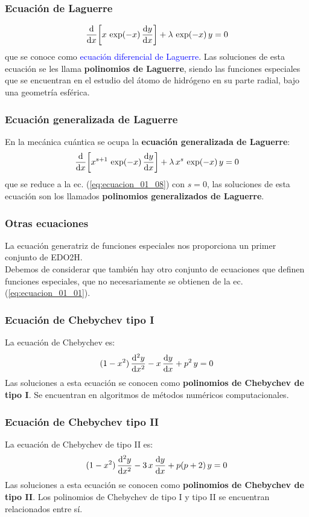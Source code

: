 \documentclass[12pt]{beamer}
\begin{document}
\begin{frame}
\frametitle{Ecuación de Laguerre}
\begin{align*}
\dv{x} \bigg[ x \, \exp(-x) \, \dv{y}{x} \bigg] + \lambda \, \exp(-x) \, y = 0
\end{align*}
\pause
que se conoce como \textcolor{blue}{ecuación diferencial de Laguerre}. \pause Las soluciones de esta ecuación se les llama \textbf{polinomios de Laguerre}, siendo las funciones especiales que se encuentran en el estudio del átomo de hidrógeno en su parte radial, bajo una geometría esférica.
\end{frame}
\begin{frame}
\frametitle{Ecuación generalizada de Laguerre}
En la mecánica cuántica se ocupa la \textbf{ecuación generalizada de Laguerre}:
\begin{align*}
\dv{x} \bigg[ x^{s+1} \, \exp(-x) \, \dv{y}{x} \bigg] + \lambda \, x^{s} \, \exp(-x) \, y = 0
\end{align*}
\pause
que se reduce a la ec. (\ref{eq:ecuacion_01_08}) con $s = 0$, las soluciones de esta ecuación son los llamados \textbf{polinomios generalizados de Laguerre}.
\end{frame}
\begin{frame}
\frametitle{Otras ecuaciones}
La ecuación generatriz de funciones especiales nos proporciona un primer conjunto de EDO2H.
\\
\bigskip
\pause
Debemos de considerar que también hay otro conjunto de ecuaciones que definen funciones especiales, que no necesariamente se obtienen de la ec. (\ref{eq:ecuacion_01_01}).
\end{frame}
\begin{frame}
\frametitle{Ecuación de Chebychev tipo I}
La ecuación de Chebychev es:
\begin{align*}
(1 - x^{2}) \, \dv[2]{y}{x} - x \, \dv{y}{x} +  p^{2} \, y = 0
\end{align*}
\pause
Las soluciones a esta ecuación se conocen como \textbf{polinomios de Chebychev de tipo I}. \pause Se encuentran en algoritmos de métodos numéricos computacionales.
\end{frame}
\begin{frame}
\frametitle{Ecuación de Chebychev tipo II}
La ecuación de Chebychev de tipo II es:
\begin{align*}
(1 - x^{2}) \, \dv[2]{y}{x} - 3 \, x \, \dv{y}{x} +  p(p + 2) \, y = 0
\end{align*}
\pause
Las soluciones a esta ecuación se conocen como \textbf{polinomios de Chebychev de tipo II}. \pause Los polinomios de Chebychev de tipo I y tipo II se encuentran relacionados entre sí.
\end{frame}
\end{document}
